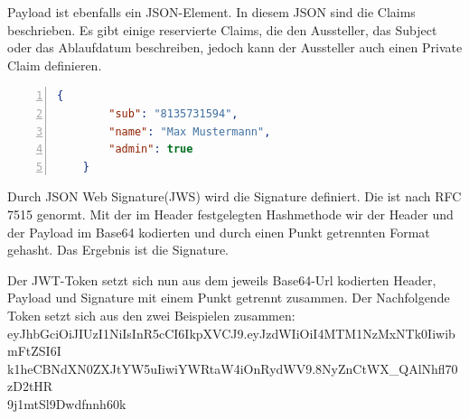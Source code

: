Payload ist ebenfalls ein JSON-Element. In diesem JSON sind die Claims beschrieben. Es gibt einige reservierte Claims, die den Aussteller, das Subject oder das Ablaufdatum beschreiben, jedoch kann der Aussteller auch einen Private Claim definieren.\\
\begin{lstlisting}[caption={JWT-Payload Beispiel},captionpos=b, numbers=left, backgroundcolor=\color{black!10}, language=json]
	{
		"sub": "8135731594",
		"name": "Max Mustermann",
		"admin": true
	}
\end{lstlisting}

Durch JSON Web Signature(JWS) wird die Signature definiert. Die ist nach RFC 7515 genormt. Mit der im Header festgelegten Hashmethode wir der Header und der Payload im Base64 kodierten und durch einen Punkt getrennten Format gehasht. Das Ergebnis ist die Signature.

Der JWT-Token setzt sich nun aus dem jeweils Base64-Url kodierten Header, Payload und Signature mit einem Punkt getrennt zusammen. \autocite{wikiJWT}
Der Nachfolgende Token setzt sich aus den zwei Beispielen zusammen:\\
eyJhbGciOiJIUzI1NiIsInR5cCI6IkpXVCJ9.eyJzdWIiOiI4MTM1NzMxNTk0IiwibmFtZSI6I\\k1heCBNdXN0ZXJtYW5uIiwiYWRtaW4iOnRydWV9.8NyZnCtWX\_QAlNhfl70zD2tHR\\9j1mtSl9Dwdfnnh60k
